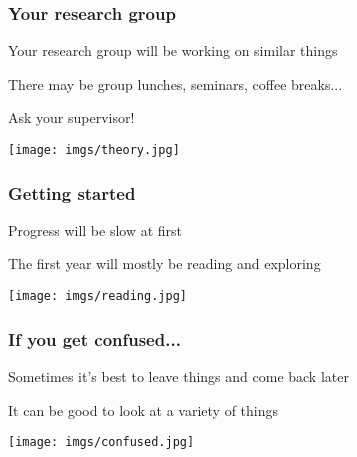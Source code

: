 \begin{frame}
    \frametitle{Your research group}
    \centering
    \begin{minipage}{0.4\textwidth}
        \centering
        \Large

        Your \alert{research group} will be working
        on similar things

        \vspace{1em}

        There may be group lunches, seminars, coffee breaks...

        \vspace{1em}

        Ask your supervisor!

    \end{minipage}
    \qquad
    \begin{minipage}{0.4\textwidth}
        \texttt{[image: imgs/theory.jpg]}
    \end{minipage}
\end{frame}
\begin{frame}
    \frametitle{Getting started}
    \centering
    \begin{minipage}{0.40\textwidth}
        \centering
        \Large

        Progress will be \alert{slow} at first

        \vspace{1em}

        The first year will mostly be \alert{reading} and
        \alert{exploring}

        \vspace{1em}
    \end{minipage}
    \qquad
    \begin{minipage}{0.4\textwidth}
        \texttt{[image: imgs/reading.jpg]}
    \end{minipage}
\end{frame}
\begin{frame}
    \frametitle{If you get confused...}
    \centering
    \begin{minipage}{0.4\textwidth}
        \centering
        \Large

        Sometimes it's best to leave things and
        \alert{come back later}

        \vspace{1em}

        It can be good to look at a \alert{variety}
        of things
    \end{minipage}
    \qquad
    \begin{minipage}{0.4\textwidth}
        \texttt{[image: imgs/confused.jpg]}
    \end{minipage}
\end{frame}
